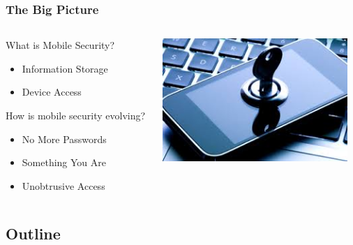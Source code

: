 \documentclass{beamer}
\begin{document}
\begin{frame}
  \frametitle{The Big Picture}
  
  \begin{columns}
  \begin{column}{0.6\textwidth}
  What is Mobile Security?
     \begin{itemize}
     \item Information Storage
  	  \item Device Access 
  	  \linebreak
     \end{itemize}
     
  How is mobile security evolving?
     \begin{itemize}
     \item No More Passwords
	  \item Something You Are
	  \item Unobtrusive Access
     \end{itemize}
  \end{column}
  \begin{column}{0.4\textwidth}
   \includegraphics[width=0.95\textwidth]{Illustrations/mobileSecurity.jpg}
       \\
  \end{column}
  \end{columns}
\end{frame}

\subsection*{Outline}
\end{document}
